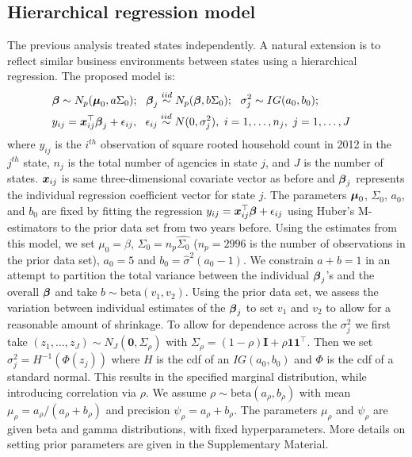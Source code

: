 \documentclass[ba]{imsart}
\def\bbeta{\mbox{\boldmath $\beta$}}
\def\bmu{\mbox{\boldmath $\mu$}}
\newcommand{\bx}{\mbox{\boldmath $x$}}
\newcommand{\mb}{\mathbf}
\newcommand{\iid}{\stackrel{iid}{\sim}}
\begin{document}
\subsection{Hierarchical regression model}
\label{hierRegNW}
The previous analysis treated states independently. A natural extension is to  reflect similar business environments between states using a hierarchical regression. The proposed model is:
\begin{align}
\label{eq:hierModel}
&\bbeta\sim N_p(\bmu_0, a\Sigma_0);\ \ 
\bbeta_j\iid N_p(\bbeta, b\Sigma_0); \ \  
\sigma_j^2\sim IG(a_0,b_0);  & \\ 
& y_{ij}=\bx_{ij}^\top\bbeta_j+\epsilon_{ij},\ \ \epsilon_{ij}\iid N(0, \sigma_j^2),\ i=1,\dots, n_j,\ j=1,\dots, J &
\end{align}
where $y_{ij}$ is the $i^{th}$ observation of square rooted household count in 2012 in the $j^{th}$
state, $n_{j}$ is the total number of agencies in state $j$, and $J$ is
the number of states. $\bx_{ij}$ is same three-dimensional covariate vector as before and $\bbeta_j$ represents the individual regression coefficient vector for state $j$. The parameters $\bmu_0$,
$\Sigma_0$, $a_0$, and $b_0$ are fixed by fitting  the regression $y_{ij}=\bx_{ij}^{\top}\bbeta+\epsilon_{ij}$ using Huber's M-estimators to the prior data set from two years before. Using the estimates from this model, we set $\mu_{0} = \hat\beta$, $\Sigma_{0} = n_{p}\hat{\Sigma_{0}}$ ($n_{p} = 2996$ is the number of observations in the prior data set), $a_{0}=5$ and $b_{0} = \hat\sigma^{2}(a_{0} -1)$. We constrain $a+b=1$
in an attempt to partition the total variance between the individual
$\bbeta_j$'s and the overall $\bbeta$ and take $b\sim
\text{beta}(v_1,v_2)$. Using the prior data set, we assess the
variation between individual estimates of the $\bbeta_j$ to set $v_1$
and $v_2$ to allow for a reasonable amount of shrinkage. To allow for
dependence across the $\sigma_j^2$ we first take
$(z_1,\dots,z_J)\sim N_J(\mathbf{0}, \Sigma_\rho)$ with
$\Sigma_\rho=(1-\rho)\mb{I}+\rho \mb{1}\mb{1}^{\top}$. Then we set
$\sigma^2_j=H^{-1}(\Phi(z_j))$ where $H$ is the cdf of an
$IG(a_0,b_0)$ and $\Phi$ is the cdf of a standard normal. This results in the specified marginal distribution, while
introducing correlation via $\rho$. We assume $\rho\sim
\text{beta}(a_\rho,b_\rho)$ with mean $\mu_\rho=a_\rho/(a_\rho+b_\rho)$ and precision
$\psi_\rho=a_\rho+b_\rho$. The parameters $\mu_\rho$ and
$\psi_{\rho}$  are given beta and gamma distributions, with fixed hyperparameters. More details on setting prior parameters are given in the Supplementary Material. 
\end{document}
